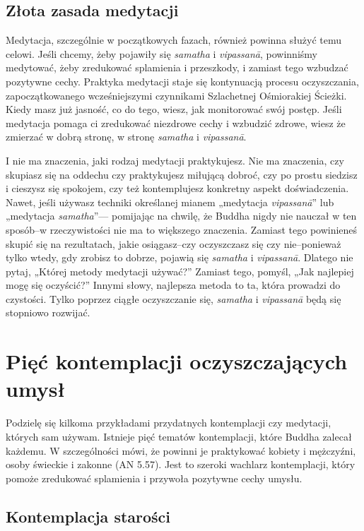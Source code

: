 \documentclass[12pt,openany]{book}
\begin{document}
\section*{ Złota zasada medytacji}

Medytacja, szczególnie w początkowych fazach, również powinna służyć temu celowi. Jeśli chcemy, żeby pojawiły się \textit{samatha} i \textit{vipassanā}, powinniśmy medytować, żeby zredukować splamienia i przeszkody, i zamiast tego wzbudzać pozytywne cechy. Praktyka medytacji staje się kontynuacją procesu oczyszczania, zapoczątkowanego wcześniejszymi czynnikami Szlachetnej Ośmiorakiej Ścieżki. Kiedy masz już jasność, co do tego, wiesz, jak monitorować swój postęp. Jeśli medytacja pomaga ci zredukować niezdrowe cechy i wzbudzić zdrowe, wiesz że zmierzać w dobrą stronę, w stronę \textit{samatha} i \textit{vipassanā}.

I nie ma znaczenia, jaki rodzaj medytacji praktykujesz. Nie ma znaczenia, czy skupiasz się na oddechu czy praktykujesz miłującą dobroć, czy po prostu siedzisz i cieszysz się spokojem, czy też kontemplujesz konkretny aspekt doświadczenia. Nawet, jeśli używasz techniki określanej mianem „medytacja \textit{vipassanā}” lub „medytacja \textit{samatha}”— pomijając na chwilę, że Buddha nigdy nie nauczał w ten sposób–w rzeczywistości nie ma to większego znaczenia. Zamiast tego powinieneś skupić się na rezultatach, jakie osiągasz–czy oczyszczasz się czy nie–ponieważ tylko wtedy, gdy zrobisz to dobrze, pojawią się \textit{samatha} i \textit{vipassanā}. Dlatego nie pytaj, „Której metody medytacji używać?” Zamiast tego, pomyśl, „Jak najlepiej mogę się oczyścić?” Innymi słowy, najlepsza metoda to ta, która prowadzi do czystości. Tylko poprzez ciągłe oczyszczanie się, \textit{samatha} i \textit{vipassanā} będą się stopniowo rozwijać.


\chapter*{Pięć kontemplacji oczyszczających umysł}


Podzielę się kilkoma przykładami przydatnych kontemplacji czy medytacji, których sam używam. Istnieje pięć tematów kontemplacji, które Buddha zalecał każdemu. W szczególności mówi, że powinni je praktykować kobiety i mężczyźni, osoby świeckie i zakonne (AN 5.57). Jest to szeroki wachlarz kontemplacji, który pomoże zredukować splamienia i przywoła pozytywne cechy umysłu.

\section*{Kontemplacja starości}
\end{document}
